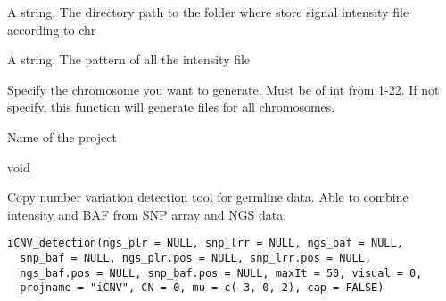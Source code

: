 \documentclass[a4paper]{book}
\begin{document}
%
\begin{Arguments}
\begin{ldescription}
\item[\code{dir}] A string. The directory path to the folder where store signal intensity file according to chr

\item[\code{pattern}] A string. The pattern of all the intensity file

\item[\code{chr}] Specify the chromosome you want to generate. Must be of int from 1-22. If not specify, this function will generate files for all chromosomes.

\item[\code{projectname}] Name of the project
\end{ldescription}
\end{Arguments}
%
\begin{Value}
void
\end{Value}
%
\begin{Examples}
\end{Examples}
%
\begin{Description}\relax
Copy number variation detection tool for germline data. Able to combine intensity and BAF from SNP array and NGS data.
\end{Description}
%
\begin{Usage}
\begin{verbatim}
iCNV_detection(ngs_plr = NULL, snp_lrr = NULL, ngs_baf = NULL,
  snp_baf = NULL, ngs_plr.pos = NULL, snp_lrr.pos = NULL,
  ngs_baf.pos = NULL, snp_baf.pos = NULL, maxIt = 50, visual = 0,
  projname = "iCNV", CN = 0, mu = c(-3, 0, 2), cap = FALSE)
\end{verbatim}
\end{Usage}
%
\end{document}
